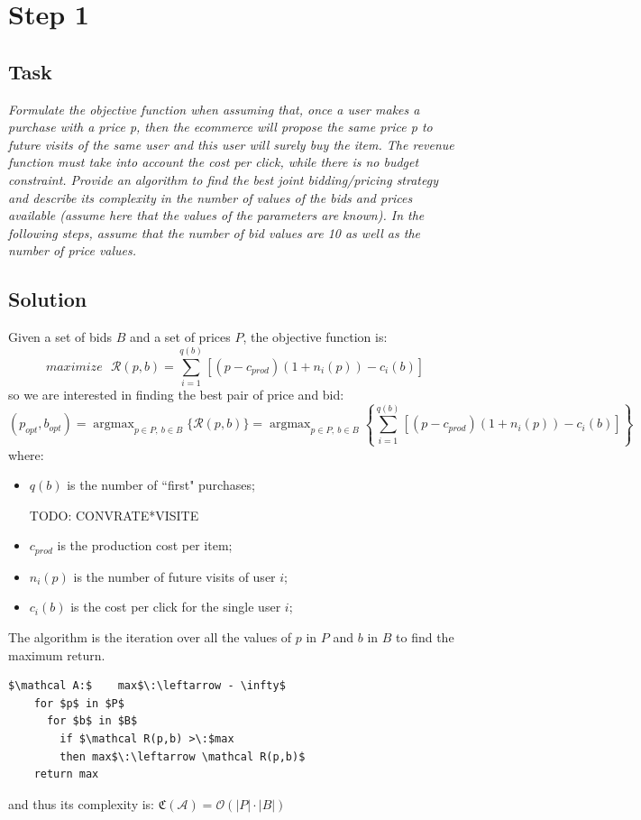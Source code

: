 \documentclass[12pt,a4paper]{report}
\DeclareMathOperator*{\argmax}{argmax}
\begin{document}
		\section{Step 1}
			\subsection{Task}
\textit{Formulate the objective function when assuming that, once a user makes a purchase with a price p, then the ecommerce will propose the same price p to future visits of the same user and this user will surely buy the item. The revenue function must take into account the cost per click, while there is no budget constraint. Provide an algorithm to find the best joint bidding/pricing strategy and describe its complexity in the number of values of the bids and prices available (assume here that the values of the parameters are known). In the following steps, assume that the number of bid values are 10 as well as the number of price values.}
			\subsection{Solution}
Given a set of bids $B$ and a set of prices $P$, the  objective function is:
\[ maximize \: \: \: \mathcal R(p,b) =  \sum_{i=1}^{q(b)}{[(p - c_{prod})(1+n_i(p)) - c_i(b)]}\]
so we are interested in finding the best pair of price and bid:
\[ (p_{opt}, b_{opt}) = \argmax_{p \in P,\: b \in B}\{ \mathcal R(p,b)\} = \argmax_{p \in P,\: b \in B}\left\{ \sum_{i=1}^{q(b)}{[(p - c_{prod})(1+n_i(p)) - c_i(b)]}  \right\}\]
where:
\begin{itemize}
	\item $q(b)$ is the number of ``first" purchases;

TODO: CONVRATE*VISITE
	\item $c_{prod}$ is the production cost per item;
	\item $n_i(p)$ is the number of future visits of user $i$;
	\item $c_i(b)$ is the cost per click for the single user $i$; 
\end{itemize}

The algorithm is the iteration over all the values of $p$ in $P$ and $b$ in $B$ to find the maximum return.

\begin{lstlisting}[mathescape=true]
    $\mathcal A:$    max$\:\leftarrow - \infty$
	for $p$ in $P$
	  for $b$ in $B$
	    if $\mathcal R(p,b) >\:$max 
	    then max$\:\leftarrow \mathcal R(p,b)$
	return max
\end{lstlisting}
and thus its complexity is: $\mathfrak C(\mathcal A) = \mathcal O(|P|\cdot |B|)$
\end{document}
